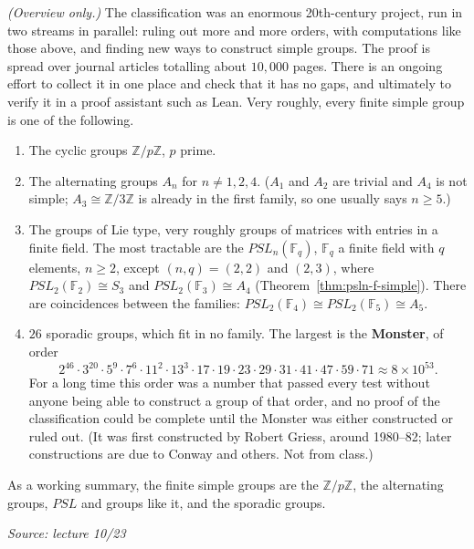 \documentclass[11pt]{report}
\newcommand{\srcline}[1]{\par\hfill{\footnotesize\textit{Source: #1}}}
\begin{document}
\begin{rembox}\label{rem:classification-finite-simple}
\textit{(Overview only.)} The classification was an enormous 20th-century project, run in two streams in parallel: ruling out more and more orders, with computations like those above, and finding new ways to construct simple groups. The proof is spread over journal articles totalling about $10{,}000$ pages. There is an ongoing effort to collect it in one place and check that it has no gaps, and ultimately to verify it in a proof assistant such as Lean. Very roughly, every finite simple group is one of the following.
\begin{enumerate}
    \item The cyclic groups $\mathbb{Z}/p\mathbb{Z}$, $p$ prime.
    \item The alternating groups $A_n$ for $n \neq 1, 2, 4$. ($A_1$ and $A_2$ are trivial and $A_4$ is not simple; $A_3 \cong \mathbb{Z}/3\mathbb{Z}$ is already in the first family, so one usually says $n \geq 5$.)
    \item The groups of Lie type, very roughly groups of matrices with entries in a finite field. The most tractable are the $PSL_n(\mathbb{F}_q)$, $\mathbb{F}_q$ a finite field with $q$ elements, $n \geq 2$, except $(n, q) = (2, 2)$ and $(2, 3)$, where $PSL_2(\mathbb{F}_2) \cong S_3$ and $PSL_2(\mathbb{F}_3) \cong A_4$ (Theorem~\ref{thm:psln-f-simple}). There are coincidences between the families: $PSL_2(\mathbb{F}_4) \cong PSL_2(\mathbb{F}_5) \cong A_5$.
    \item $26$ sporadic groups, which fit in no family. The largest is the \textbf{Monster}, of order
    \[ 2^{46} \cdot 3^{20} \cdot 5^{9} \cdot 7^{6} \cdot 11^{2} \cdot 13^{3} \cdot 17 \cdot 19 \cdot 23 \cdot 29 \cdot 31 \cdot 41 \cdot 47 \cdot 59 \cdot 71 \approx 8 \times 10^{53}. \]
    For a long time this order was a number that passed every test without anyone being able to construct a group of that order, and no proof of the classification could be complete until the Monster was either constructed or ruled out. (It was first constructed by Robert Griess, around 1980--82; later constructions are due to Conway and others. Not from class.)
\end{enumerate}
As a working summary, the finite simple groups are the $\mathbb{Z}/p\mathbb{Z}$, the alternating groups, $PSL$ and groups like it, and the sporadic groups.
\srcline{lecture 10/23}
\end{rembox}
\end{document}
